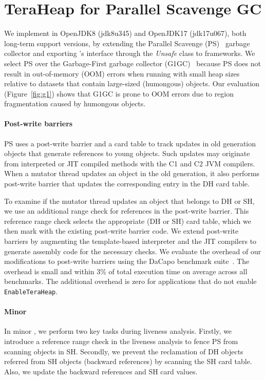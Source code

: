 \section{TeraHeap for Parallel Scavenge GC}
\label{teraheap:sec:impl}

We implement \teraheapName{} in OpenJDK8 (jdk8u345) and OpenJDK17 (jdk17u067), both
long-term support versions, by extending the Parallel Scavenge
(PS)~\cite{jones:gc_handbook} garbage collector and exporting \teraheapName{}'s interface
through the \emph{Unsafe} class to frameworks.
%
We select PS over the Garbage-First garbage collector (G1GC)~\cite{zhao:g1}
because PS does not result in out-of-memory (OOM) errors when running with small
heap sizes relative to datasets that contain large-sized (humongous) objects.
Our evaluation (Figure~\ref{fig:g1}) shows that G1GC is prone to OOM errors due
to region fragmentation caused by humongous objects.

\paragraph{\textbf{Post-write barriers}}
PS uses a post-write barrier and a card table to track updates in old
generation objects that generate references to young objects. Such
updates may originate from interpreted or JIT compiled methods with
the C1 and C2 JVM compilers. When a mutator thread updates an object
in the old generation, it also performs post-write barrier that
updates the corresponding entry in the DH card table.

To examine if the mutator thread updates an object that belongs to DH
or SH, we use an additional range check for references in the
post-write barrier. This reference range check selects the appropriate
(DH or SH) card table, which we then mark with the existing post-write
barrier code. We extend post-write barriers by augmenting the
template-based interpreter and the JIT compilers to generate assembly
code for the necessary checks. We evaluate the overhead of our
modifications to post-write barriers using the DaCapo benchmark
suite~\cite{blackburn:dacapo}. The overhead is small and within 3\% of
total execution time on average across all benchmarks. The additional
overhead is zero for applications that do not enable
\texttt{EnableTeraHeap}.

\paragraph{\textbf{Minor \teraheapGC}}
In minor \teraheapGC, we perform two key tasks during liveness analysis.
Firstly, we introduce a reference range check in the liveness analysis
to fence PS from scanning objects in SH. Secondly, we prevent the
reclamation of DH objects referred from SH objects (backward
references) by scanning the SH card table. Also, we update the
backward references and SH card values.

